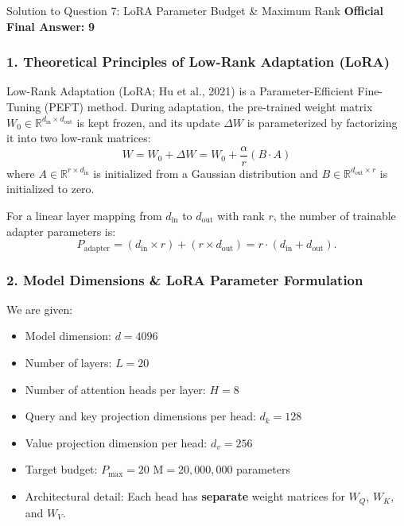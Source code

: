 \documentclass[11pt,a4paper]{article}
\begin{document}
\begin{solutionbox}{Solution to Question 7: LoRA Parameter Budget \& Maximum Rank}
\textbf{Official Final Answer:} \textbf{9}

\subsubsection*{1. Theoretical Principles of Low-Rank Adaptation (LoRA)}
Low-Rank Adaptation (LoRA; Hu et al., 2021) is a Parameter-Efficient Fine-Tuning (PEFT) method. During adaptation, the pre-trained weight matrix $W_0 \in \mathbb{R}^{d_{\text{in}} \times d_{\text{out}}}$ is kept frozen, and its update $\Delta W$ is parameterized by factorizing it into two low-rank matrices:
\begin{equation}
W = W_0 + \Delta W = W_0 + \frac{\alpha}{r} (B \cdot A)
\end{equation}
where $A \in \mathbb{R}^{r \times d_{\text{in}}}$ is initialized from a Gaussian distribution and $B \in \mathbb{R}^{d_{\text{out}} \times r}$ is initialized to zero.

For a linear layer mapping from $d_{\text{in}}$ to $d_{\text{out}}$ with rank $r$, the number of trainable adapter parameters is:
\begin{equation}
P_{\text{adapter}} = (d_{\text{in}} \times r) + (r \times d_{\text{out}}) = r \cdot (d_{\text{in}} + d_{\text{out}}).
\end{equation}

\subsubsection*{2. Model Dimensions \& LoRA Parameter Formulation}
We are given:
\begin{itemize}[noitemsep]
    \item Model dimension: $d = 4096$
    \item Number of layers: $L = 20$
    \item Number of attention heads per layer: $H = 8$
    \item Query and key projection dimensions per head: $d_k = 128$
    \item Value projection dimension per head: $d_v = 256$
    \item Target budget: $P_{\max} = 20\text{ M} = 20{,}000{,}000$ parameters
    \item Architectural detail: Each head has \textbf{separate} weight matrices for $W_Q$, $W_K$, and $W_V$.
\end{itemize}


\end{solutionbox}
\end{document}
